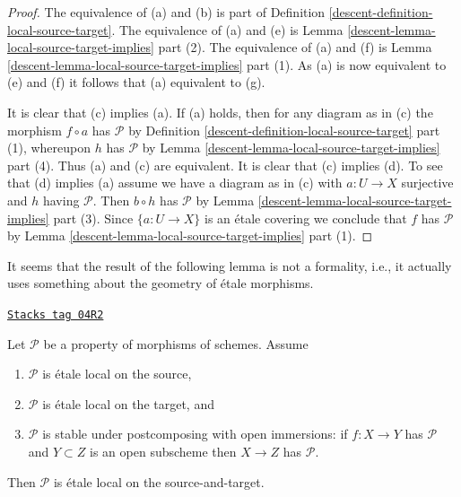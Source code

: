 \begin{proof}

The equivalence of (a) and (b) is part of
Definition \ref{descent-definition-local-source-target}.
The equivalence of (a) and (e) is
Lemma \ref{descent-lemma-local-source-target-implies} part (2).
The equivalence of (a) and (f) is
Lemma \ref{descent-lemma-local-source-target-implies} part (1).
As (a) is now equivalent to (e) and (f) it follows that
(a) equivalent to (g).

\medskip\noindent
It is clear that (c) implies (a). If (a) holds, then for any
diagram as in (c) the morphism $f \circ a$ has $\mathcal{P}$ by
Definition \ref{descent-definition-local-source-target} part (1),
whereupon $h$ has $\mathcal{P}$ by
Lemma \ref{descent-lemma-local-source-target-implies} part (4).
Thus (a) and (c) are equivalent. It is clear that (c) implies (d).
To see that (d) implies (a) assume we have a diagram as in (c)
with $a : U \to X$ surjective and $h$ having $\mathcal{P}$.
Then $b \circ h$ has $\mathcal{P}$ by
Lemma \ref{descent-lemma-local-source-target-implies} part (3).
Since $\{a : U \to X\}$ is an \'etale covering we conclude that
$f$ has $\mathcal{P}$ by
Lemma \ref{descent-lemma-local-source-target-implies} part (1).
\end{proof}

It seems that the result of the following lemma is not a formality, i.e.,
it actually uses something about the geometry of \'etale morphisms.

\begin{lemma}
\label{descent-lemma-etale-local-source-target}
\href{https://stacks.math.columbia.edu/tag/04R2}{\texttt{Stacks tag 04R2}}

Let $\mathcal{P}$ be a property of morphisms of schemes.
Assume
\begin{enumerate}
\item $\mathcal{P}$ is \'etale local on the source,
\item $\mathcal{P}$ is \'etale local on the target, and
\item $\mathcal{P}$ is stable under postcomposing with open immersions:
if $f : X \to Y$ has $\mathcal{P}$ and $Y \subset Z$ is an open
subscheme then $X \to Z$ has $\mathcal{P}$.
\end{enumerate}
Then $\mathcal{P}$ is \'etale local on the source-and-target.
\end{lemma}

